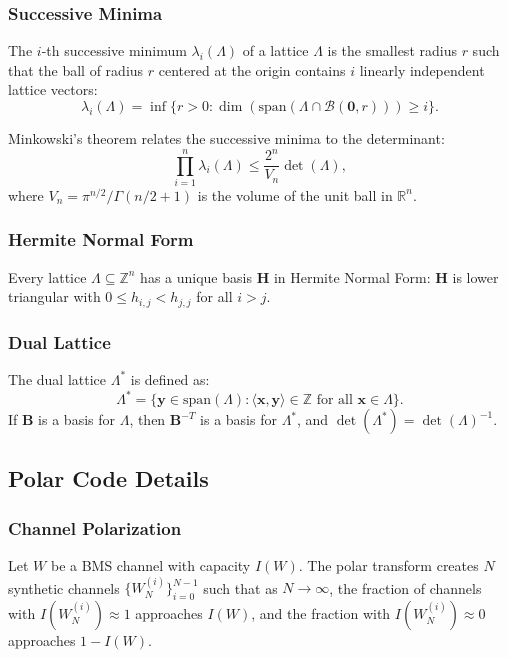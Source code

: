 \documentclass[11pt,a4paper]{article}
\newcommand{\Z}{\mathbb{Z}}
\newcommand{\R}{\mathbb{R}}
\begin{document}
\subsubsection{Successive Minima}

The $i$-th successive minimum $\lambda_i(\Lambda)$ of a lattice $\Lambda$ is the smallest radius $r$ such that the ball of radius $r$ centered at the origin contains $i$ linearly independent lattice vectors:
\[
\lambda_i(\Lambda) = \inf\{r > 0 : \dim(\text{span}(\Lambda \cap \mathcal{B}(\mathbf{0}, r))) \geq i\}.
\]

Minkowski's theorem relates the successive minima to the determinant:
\[
\prod_{i=1}^{n} \lambda_i(\Lambda) \leq \frac{2^n}{V_n} \det(\Lambda),
\]
where $V_n = \pi^{n/2} / \Gamma(n/2 + 1)$ is the volume of the unit ball in $\R^n$.

\subsubsection{Hermite Normal Form}

Every lattice $\Lambda \subseteq \Z^n$ has a unique basis $\mathbf{H}$ in Hermite Normal Form: $\mathbf{H}$ is lower triangular with $0 \leq h_{i,j} < h_{j,j}$ for all $i > j$.

\subsubsection{Dual Lattice}

The dual lattice $\Lambda^*$ is defined as:
\[
\Lambda^* = \{\mathbf{y} \in \text{span}(\Lambda) : \langle \mathbf{x}, \mathbf{y} \rangle \in \Z \text{ for all } \mathbf{x} \in \Lambda\}.
\]
If $\mathbf{B}$ is a basis for $\Lambda$, then $\mathbf{B}^{-T}$ is a basis for $\Lambda^*$, and $\det(\Lambda^*) = \det(\Lambda)^{-1}$.

\subsection{Polar Code Details}\label{app:polar-details}

\subsubsection{Channel Polarization}

Let $W$ be a BMS channel with capacity $I(W)$. The polar transform creates $N$ synthetic channels $\{W_N^{(i)}\}_{i=0}^{N-1}$ such that as $N \to \infty$, the fraction of channels with $I(W_N^{(i)}) \approx 1$ approaches $I(W)$, and the fraction with $I(W_N^{(i)}) \approx 0$ approaches $1 - I(W)$.
\end{document}
